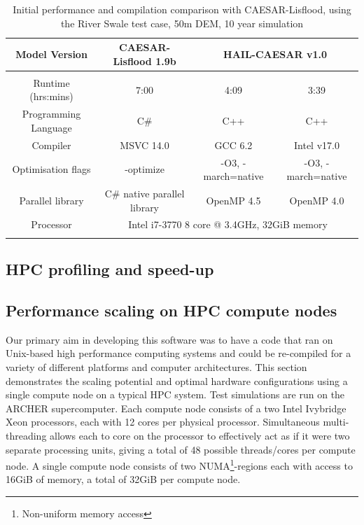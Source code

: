 \begin{table}


\resizebox{\textwidth}{!}
{%
\begin{tabular}{cccc}
Model Version & \textbf{CAESAR-Lisflood 1.9b} & \multicolumn{2}{c}{\textbf{HAIL-CAESAR v1.0}} \\
\hline \\
Runtime (hrs:mins) & 7:00 & 4:09 & 3:39 \\
Programming Language & C\# & C++ & C++ \\
Compiler & MSVC 14.0 & GCC 6.2 & Intel v17.0 \\
Optimisation flags & -optimize & -O3, -march=native & -O3, -march=native \\
Parallel library & C\# native parallel library & OpenMP 4.5 & OpenMP 4.0 \\
Processor & \multicolumn{3}{c}{Intel i7-3770 8 core @ 3.4GHz, 32GiB memory} \\
\hline \\
\end{tabular} 
}
\caption{Initial performance and compilation comparison with CAESAR-Lisflood, using the River Swale test case, 50m DEM, 10 year simulation} 
\label{versus_CL}
\end{table}

\subsection{HPC profiling and speed-up}

\subsection{Performance scaling on HPC compute nodes}
Our primary aim in developing this software was to have a code that ran on Unix-based high performance computing systems and could be re-compiled for a variety of different platforms and computer architectures. This section demonstrates the scaling potential and optimal hardware configurations using a single compute node on a typical HPC system. Test simulations are run on the ARCHER supercomputer. Each compute node consists of a two Intel Ivybridge Xeon processors, each with 12 cores per physical processor. Simultaneous multi-threading allows each to core on the processor to effectively act as if it were two separate processing units, giving a total of 48 possible threads/cores per compute node. A single compute node consists of two NUMA\footnote{Non-uniform memory access}-regions each with access to 16GiB of memory, a total of 32GiB per compute node. 

